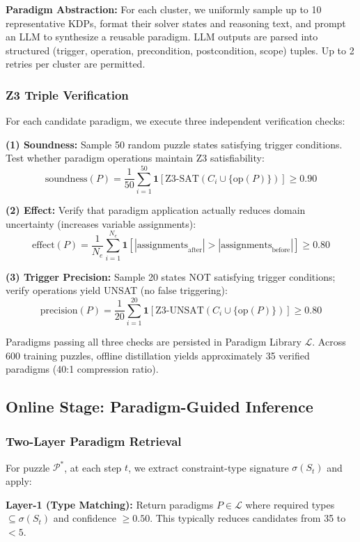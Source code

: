 \documentclass[letterpaper]{article}
\begin{document}
\textbf{Paradigm Abstraction:} For each cluster, we uniformly sample up to 10 representative KDPs, format their solver states and reasoning text, and prompt an LLM to synthesize a reusable paradigm. LLM outputs are parsed into structured (trigger, operation, precondition, postcondition, scope) tuples. Up to 2 retries per cluster are permitted.

\subsubsection{Z3 Triple Verification}

For each candidate paradigm, we execute three independent verification checks:

\textbf{(1) Soundness:} Sample 50 random puzzle states satisfying trigger conditions. Test whether paradigm operations maintain Z3 satisfiability:
$$\text{soundness}(P) = \frac{1}{50} \sum_{i=1}^{50} \mathbf{1}[\text{Z3-SAT}(C_i \cup \{\text{op}(P)\})] \geq 0.90$$

\textbf{(2) Effect:} Verify that paradigm application actually reduces domain uncertainty (increases variable assignments):
$$\text{effect}(P) = \frac{1}{N_e} \sum_{i=1}^{N_e} \mathbf{1}[|\text{assignments}_{\text{after}}| > |\text{assignments}_{\text{before}}|] \geq 0.80$$

\textbf{(3) Trigger Precision:} Sample 20 states NOT satisfying trigger conditions; verify operations yield UNSAT (no false triggering):
$$\text{precision}(P) = \frac{1}{20} \sum_{i=1}^{20} \mathbf{1}[\text{Z3-UNSAT}(C_i \cup \{\text{op}(P)\})] \geq 0.80$$

Paradigms passing all three checks are persisted in Paradigm Library $\mathcal{L}$. Across 600 training puzzles, offline distillation yields approximately 35 verified paradigms (40:1 compression ratio).

\subsection{Online Stage: Paradigm-Guided Inference}

\subsubsection{Two-Layer Paradigm Retrieval}

For puzzle $\mathcal{P}^*$, at each step $t$, we extract constraint-type signature $\sigma(S_t)$ and apply:

\textbf{Layer-1 (Type Matching):} Return paradigms $P \in \mathcal{L}$ where required types $\subseteq \sigma(S_t)$ and confidence $\geq 0.50$. This typically reduces candidates from 35 to $< 5$.
\end{document}
